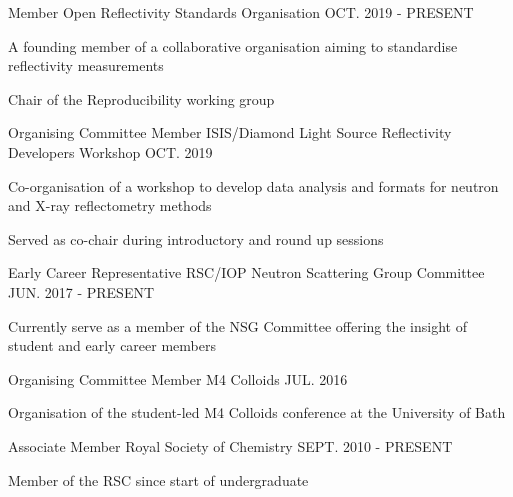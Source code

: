 \begin{cventries}
  \cventry
    {Member}
    {Open Reflectivity Standards Organisation}
    {}
    {OCT. 2019 - PRESENT}
    {
      \begin {cvitems}
        \item {A founding member of a collaborative organisation aiming to standardise reflectivity measurements}
        \item {Chair of the Reproducibility working group}
      \end {cvitems}
    }
  \cventry
    {Organising Committee Member}
    {ISIS/Diamond Light Source Reflectivity Developers Workshop}
    {}
    {OCT. 2019}
    {
      \begin{cvitems}
        \item{Co-organisation of a workshop to develop data analysis and formats for neutron and X-ray reflectometry methods}
        \item{Served as co-chair during introductory and round up sessions}
      \end{cvitems}
    }
  \cventry
  	{Early Career Representative}
    {RSC/IOP Neutron Scattering Group Committee}
    {}
    {JUN. 2017 - PRESENT}
    {
      \begin{cvitems}
      	\item{Currently serve as a member of the NSG Committee offering the insight of student and early career members}
	  \end{cvitems}
	}
  \cventry
    {Organising Committee Member}
    {M4 Colloids}
    {}
    {JUL. 2016}
    {
      \begin{cvitems}
        \item{Organisation of the student-led M4 Colloids conference at the University of Bath}
      \end{cvitems}
    }
  \cventry
    {Associate Member}
    {Royal Society of Chemistry}
    {}
    {SEPT. 2010 - PRESENT}
    {
      \begin{cvitems}
      	\item{Member of the RSC since start of undergraduate}
      \end{cvitems}
    }
\end{cventries}

